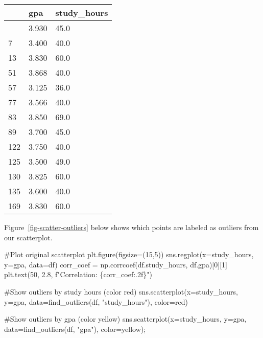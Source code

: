 \documentclass[
  letterpaper,
  DIV=11,
  numbers=noendperiod]{scrreprt}
\newenvironment{Shaded}{\begin{snugshade}}{\end{snugshade}}
\newcommand{\CommentTok}[1]{\textcolor[rgb]{0.37,0.37,0.37}{#1}}
\newcommand{\DecValTok}[1]{\textcolor[rgb]{0.68,0.00,0.00}{#1}}
\newcommand{\FloatTok}[1]{\textcolor[rgb]{0.68,0.00,0.00}{#1}}
\newcommand{\NormalTok}[1]{\textcolor[rgb]{0.00,0.23,0.31}{#1}}
\newcommand{\OperatorTok}[1]{\textcolor[rgb]{0.37,0.37,0.37}{#1}}
\newcommand{\SpecialCharTok}[1]{\textcolor[rgb]{0.37,0.37,0.37}{#1}}
\newcommand{\SpecialStringTok}[1]{\textcolor[rgb]{0.13,0.47,0.30}{#1}}
\newcommand{\StringTok}[1]{\textcolor[rgb]{0.13,0.47,0.30}{#1}}
\begin{document}
\begin{longtable}[]{@{}lll@{}}
\toprule\noalign{}
& gpa & study\_hours \\
\midrule\noalign{}
\endhead
\bottomrule\noalign{}
\endlastfoot
2 & 3.930 & 45.0 \\
7 & 3.400 & 40.0 \\
13 & 3.830 & 60.0 \\
51 & 3.868 & 40.0 \\
57 & 3.125 & 36.0 \\
77 & 3.566 & 40.0 \\
83 & 3.850 & 69.0 \\
89 & 3.700 & 45.0 \\
122 & 3.750 & 40.0 \\
125 & 3.500 & 49.0 \\
130 & 3.825 & 60.0 \\
135 & 3.600 & 40.0 \\
169 & 3.830 & 60.0 \\
\end{longtable}

Figure~\ref{fig-scatter-outliers} below shows which points are labeled
as outliers from our scatterplot.

\begin{Shaded}
\begin{Highlighting}[]
\CommentTok{\#Plot original scatterplot}
\NormalTok{plt.figure(figsize}\OperatorTok{=}\NormalTok{(}\DecValTok{15}\NormalTok{,}\DecValTok{5}\NormalTok{))}
\NormalTok{sns.regplot(x}\OperatorTok{=}\StringTok{\textquotesingle{}study\_hours\textquotesingle{}}\NormalTok{, y}\OperatorTok{=}\StringTok{\textquotesingle{}gpa\textquotesingle{}}\NormalTok{, data}\OperatorTok{=}\NormalTok{df)}
\NormalTok{corr\_coef }\OperatorTok{=}\NormalTok{ np.corrcoef(df.study\_hours, df.gpa)[}\DecValTok{0}\NormalTok{][}\DecValTok{1}\NormalTok{]}
\NormalTok{plt.text(}\DecValTok{50}\NormalTok{, }\FloatTok{2.8}\NormalTok{, }\SpecialStringTok{f"Correlation: }\SpecialCharTok{\{}\NormalTok{corr\_coef}\SpecialCharTok{:.2f\}}\SpecialStringTok{"}\NormalTok{)}

\CommentTok{\#Show outliers by study hours (color red)}
\NormalTok{sns.scatterplot(x}\OperatorTok{=}\StringTok{\textquotesingle{}study\_hours\textquotesingle{}}\NormalTok{, y}\OperatorTok{=}\StringTok{\textquotesingle{}gpa\textquotesingle{}}\NormalTok{, data}\OperatorTok{=}\NormalTok{find\_outliers(df, }\StringTok{"study\_hours"}\NormalTok{), color}\OperatorTok{=}\StringTok{\textquotesingle{}red\textquotesingle{}}\NormalTok{)}

\CommentTok{\#Show outliers by gpa (color yellow)}
\NormalTok{sns.scatterplot(x}\OperatorTok{=}\StringTok{\textquotesingle{}study\_hours\textquotesingle{}}\NormalTok{, y}\OperatorTok{=}\StringTok{\textquotesingle{}gpa\textquotesingle{}}\NormalTok{, data}\OperatorTok{=}\NormalTok{find\_outliers(df, }\StringTok{"gpa"}\NormalTok{), color}\OperatorTok{=}\StringTok{\textquotesingle{}yellow\textquotesingle{}}\NormalTok{)}\OperatorTok{;}
\end{Highlighting}
\end{Shaded}
\end{document}
